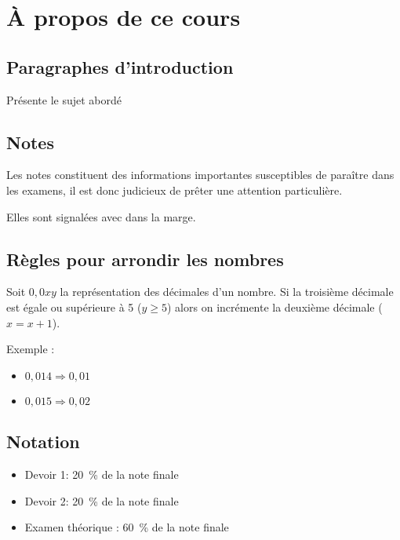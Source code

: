 \chapter*{À propos de ce cours}



\section*{Paragraphes d'introduction}
\begin{intro}
	Présente le sujet abordé 
\end{intro}



\section*{Notes}
\begin{note}
	Les notes constituent des informations importantes susceptibles de paraître dans les examens, il est donc judicieux de prêter une attention particulière. 
\end{note}
Elles sont signalées avec \righthand{} dans la marge.






\section*{Règles pour arrondir les nombres}
Soit $0,0xy$ la représentation des décimales d'un nombre. Si la troisième décimale est égale ou supérieure à 5 ($y \geq 5$) alors on incrémente la deuxième décimale ($x = x + 1$).

Exemple :
\begin{itemize}
	\item $0,014 \Rightarrow 0,01$
	\item $0,015 \Rightarrow 0,02$
\end{itemize}



\section*{Notation}
\begin{itemize}
	\item Devoir 1: 20~\% de la note finale
	\item Devoir 2: 20~\% de la note finale
	\item Examen théorique : 60~\% de la note finale
\end{itemize}
